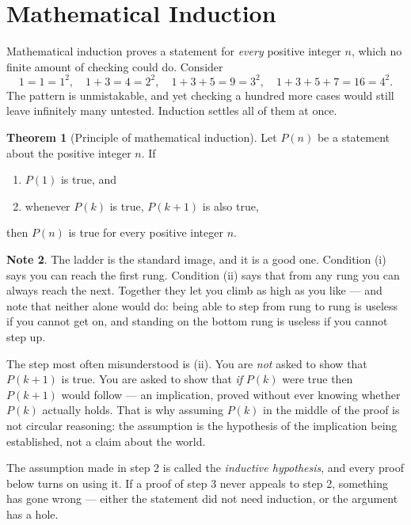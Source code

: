 \documentclass[11pt,a4paper]{article}
\theoremstyle{definition}
\newtheorem{thm}{Theorem}[section]
\newtheorem{note}[thm]{Note}
\begin{document}
\pagebreak
\section{Mathematical Induction}
Mathematical induction proves a statement for \emph{every} positive integer $n$,
which no finite amount of checking could do. Consider
$$1=1=1^{2},\quad 
1+3=4=2^{2},\quad 
1+3+5=9=3^{2},\quad 
1+3+5+7=16=4^{2}.$$
The pattern is unmistakable, and yet checking a hundred more cases would still
leave infinitely many untested. Induction settles all of them at once.

\begin{thm}[Principle of mathematical induction]
Let $P(n)$ be a statement about the positive integer $n$. If
\begin{enumerate}
\item[(i).] $P(1)$ is true, and
\item[(ii).] whenever $P(k)$ is true, $P(k+1)$ is also true,
\end{enumerate}
then $P(n)$ is true for every positive integer $n$.
\end{thm}

\begin{note}
The ladder is the standard image, and it is a good one. Condition (i) says you can
reach the first rung. Condition (ii) says that from any rung you can always reach
the next. Together they let you climb as high as you like --- and note that neither
alone would do: being able to step from rung to rung is useless if you cannot get
on, and standing on the bottom rung is useless if you cannot step up.

The step most often misunderstood is (ii). You are \emph{not} asked to show that
$P(k+1)$ is true. You are asked to show that \emph{if} $P(k)$ were true then
$P(k+1)$ would follow --- an implication, proved without ever knowing whether
$P(k)$ actually holds. That is why assuming $P(k)$ in the middle of the proof is
not circular reasoning: the assumption is the hypothesis of the implication being
established, not a claim about the world.

The assumption made in step 2 is called the \emph{inductive hypothesis}, and every
proof below turns on using it. If a proof of step 3 never appeals to step 2,
something has gone wrong --- either the statement did not need induction, or the
argument has a hole.
\end{note}
\end{document}
